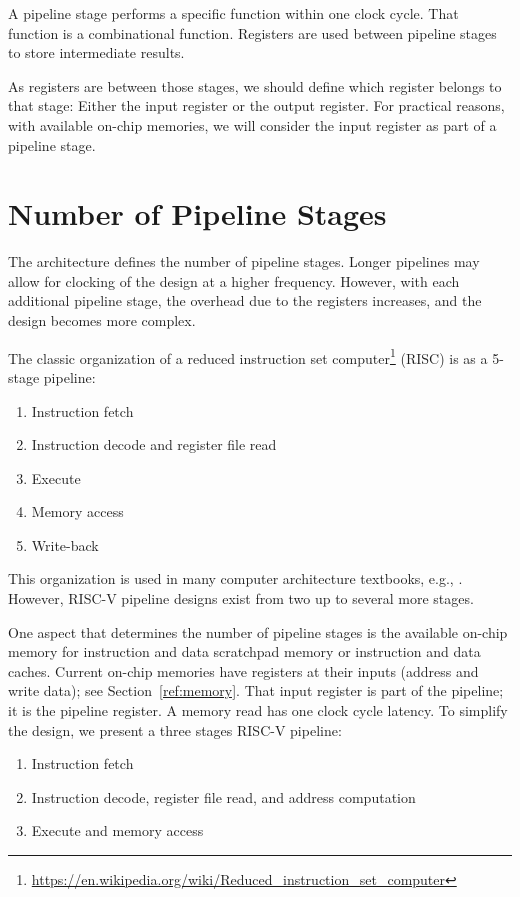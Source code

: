 \documentclass[%
    10pt,
    headinclude, footinclude=false,
    openright, %
    notitlepage,
    cleardoublepage=empty,
    headsepline,
    numbers=noenddot,
    bibliography=totoc, index=totoc,
    ]{scrbook}
\newcommand{\myref}[2]{\href{#1}{#2}}
\renewcommand{\myref}[2]{{#2}{\footnote{\url{#1}}}}
\begin{document}
A pipeline stage performs a specific function within one clock cycle. That function is
a combinational function. Registers are used between pipeline stages to store intermediate
results.

As registers are between those stages, we should define which register belongs to that stage:
Either the input register or the output register. For practical reasons, with available on-chip
memories, we will consider the input register as part of a pipeline stage.

\section{Number of Pipeline Stages}

The architecture defines the number of pipeline stages. Longer pipelines may allow
for clocking of the design at a higher frequency. However, with each additional pipeline stage,
the overhead due to the registers increases, and the design becomes more complex.

The classic organization of a \myref{https://en.wikipedia.org/wiki/Reduced_instruction_set_computer}{reduced instruction set computer} (RISC) is as a 5-stage pipeline:
\begin{enumerate}
\item Instruction fetch
\item Instruction decode and register file read
\item Execute
\item Memory access
\item Write-back
\end{enumerate}

This organization is used in many computer architecture textbooks, e.g., \cite{Patterson20}.
However, RISC-V pipeline designs exist from two up to several more stages.

One aspect that determines the number of pipeline stages is the available on-chip memory
for instruction and data scratchpad memory or instruction and data caches.
Current on-chip memories have registers at their inputs (address and write data); see Section~\ref{ref:memory}. That input register is part of the pipeline; it is the
pipeline register. A memory read has one clock cycle latency.
To simplify the design, we present a three stages RISC-V pipeline:

\begin{enumerate}
\item Instruction fetch
\item Instruction decode, register file read, and address computation
\item Execute and memory access
\end{enumerate}
\end{document}
